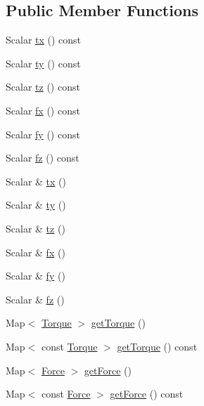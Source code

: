 \subsection*{Public Member Functions}
\begin{DoxyCompactItemize}
\item 
Scalar \hyperlink{class_wrench_base_a28eccf6ee6ec9a0e8ad6f0a130c17f0a}{tx} () const
\item 
Scalar \hyperlink{class_wrench_base_a7d574941740c725e035df6af20c0af6c}{ty} () const
\item 
Scalar \hyperlink{class_wrench_base_accf6a99e5dd656d46a0e848add0c9e85}{tz} () const
\item 
Scalar \hyperlink{class_wrench_base_ab4883d6553bab8cbe99737b664cbbd31}{fx} () const
\item 
Scalar \hyperlink{class_wrench_base_a9cf08f34e7d12b9fda2cd521fbca527e}{fy} () const
\item 
Scalar \hyperlink{class_wrench_base_a045d6010d317ce4ee578bfcf1f0162c7}{fz} () const
\item 
Scalar \& \hyperlink{class_wrench_base_a6f0a892dcdd42565538c3a979550a0ef}{tx} ()
\item 
Scalar \& \hyperlink{class_wrench_base_a304d93cdcd1b5aa6c40e2ef023ac4dc7}{ty} ()
\item 
Scalar \& \hyperlink{class_wrench_base_af48dd83f4f8500515b199e42808232a9}{tz} ()
\item 
Scalar \& \hyperlink{class_wrench_base_a3d177354f7fd128d20f8086b7e071116}{fx} ()
\item 
Scalar \& \hyperlink{class_wrench_base_a3e763c1e4c335d4f13e45a1a1a05c7f3}{fy} ()
\item 
Scalar \& \hyperlink{class_wrench_base_a70511caf28052f4306021576a82690b9}{fz} ()
\item 
Map$<$ \hyperlink{class_wrench_base_a8fa1b5e32e8418247118cc24be70d68d}{Torque} $>$ \hyperlink{class_wrench_base_a98a8a8c4e950d4876d4d0ca572e85c6a}{get\+Torque} ()
\item 
Map$<$ const \hyperlink{class_wrench_base_a8fa1b5e32e8418247118cc24be70d68d}{Torque} $>$ \hyperlink{class_wrench_base_aeaa544c7a85fdb6e38af179b9dad68ab}{get\+Torque} () const
\item 
Map$<$ \hyperlink{class_wrench_base_aa589699bbf0d18c023a0a2fe6482b4a7}{Force} $>$ \hyperlink{class_wrench_base_a3c7a5e30eb3caafa7fc5d41899167f99}{get\+Force} ()
\item 
Map$<$ const \hyperlink{class_wrench_base_aa589699bbf0d18c023a0a2fe6482b4a7}{Force} $>$ \hyperlink{class_wrench_base_ad7a67b2a101a6ce7fdd5d526b403c366}{get\+Force} () const

\end{DoxyCompactItemize}
